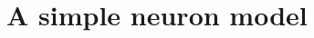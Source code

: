 \documentclass[12pt]{report}
\begin{document}

%
%
%

%
%
%
%
%
%
%

\chapter{A simple neuron model}

%
%


\end{document}
